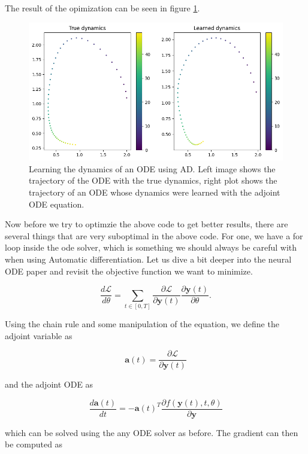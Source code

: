 \documentclass{article}
\begin{document}
{\begin{appendices}
The result of the opimization can be seen in figure \ref{fig:ode-ad}.

\begin{figure}[h]
    \centering
    \includegraphics[width=0.75\linewidth]{img/ad.png}
    \caption{Learning the dynamics of an ODE using AD. Left image shows the trajectory of the ODE with the true dynamics, right plot shows the trajectory of an ODE whose dynamics were learned with the adjoint ODE equation.}
    \label{fig:ode-ad}
\end{figure}

Now before we try to optimzie the above code to get better results, there are several things that are very suboptimal in the above code. For one, we have a for loop inside the ode solver, which is something we should always be careful with when using Automatic differentiation. Let us dive a bit deeper into the neural ODE paper and revisit the objective function we want to minimize.

\begin{equation}
\frac{d \mathcal{L}}{d \theta} = \sum_{t \in [0, T]} \frac{\partial \mathcal{L}}{\partial \mathbf{y}(t)} \frac{\partial \mathbf{y}(t)}{\partial \theta}.
\end{equation}

Using the chain rule and some manipulation of the equation, we define the adjoint variable as

\begin{equation}
\mathbf{a}(t) = \frac{\partial \mathcal{L}}{\partial \mathbf{y}(t)}
\end{equation}

and the adjoint ODE as

\begin{equation}
\frac{d\mathbf{a}(t)}{dt} = -\mathbf{a}(t)^T \frac{\partial f(\mathbf{y}(t), t, \theta)}{\partial \mathbf{y}}
\end{equation}

which can be solved using the any ODE solver as before. The gradient can then be computed as


\end{appendices}}
\end{document}
